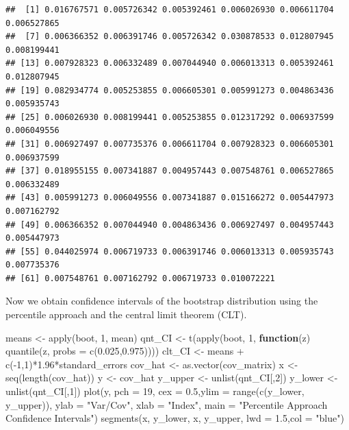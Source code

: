 \documentclass[
]{article}
\newenvironment{Shaded}{\begin{snugshade}}{\end{snugshade}}
\newcommand{\AttributeTok}[1]{\textcolor[rgb]{0.77,0.63,0.00}{#1}}
\newcommand{\ControlFlowTok}[1]{\textcolor[rgb]{0.13,0.29,0.53}{\textbf{#1}}}
\newcommand{\DecValTok}[1]{\textcolor[rgb]{0.00,0.00,0.81}{#1}}
\newcommand{\FloatTok}[1]{\textcolor[rgb]{0.00,0.00,0.81}{#1}}
\newcommand{\FunctionTok}[1]{\textcolor[rgb]{0.00,0.00,0.00}{#1}}
\newcommand{\NormalTok}[1]{#1}
\newcommand{\OtherTok}[1]{\textcolor[rgb]{0.56,0.35,0.01}{#1}}
\newcommand{\SpecialCharTok}[1]{\textcolor[rgb]{0.00,0.00,0.00}{#1}}
\newcommand{\StringTok}[1]{\textcolor[rgb]{0.31,0.60,0.02}{#1}}
\begin{document}
\begin{verbatim}
##  [1] 0.016767571 0.005726342 0.005392461 0.006026930 0.006611704 0.006527865
##  [7] 0.006366352 0.006391746 0.005726342 0.030878533 0.012807945 0.008199441
## [13] 0.007928323 0.006332489 0.007044940 0.006013313 0.005392461 0.012807945
## [19] 0.082934774 0.005253855 0.006605301 0.005991273 0.004863436 0.005935743
## [25] 0.006026930 0.008199441 0.005253855 0.012317292 0.006937599 0.006049556
## [31] 0.006927497 0.007735376 0.006611704 0.007928323 0.006605301 0.006937599
## [37] 0.018955155 0.007341887 0.004957443 0.007548761 0.006527865 0.006332489
## [43] 0.005991273 0.006049556 0.007341887 0.015166272 0.005447973 0.007162792
## [49] 0.006366352 0.007044940 0.004863436 0.006927497 0.004957443 0.005447973
## [55] 0.044025974 0.006719733 0.006391746 0.006013313 0.005935743 0.007735376
## [61] 0.007548761 0.007162792 0.006719733 0.010072221
\end{verbatim}

Now we obtain confidence intervals of the bootstrap distribution using
the percentile approach and the central limit theorem (CLT).

\begin{Shaded}
\begin{Highlighting}[]
\NormalTok{means }\OtherTok{\textless{}{-}} \FunctionTok{apply}\NormalTok{(boot, }\DecValTok{1}\NormalTok{, mean)}
\NormalTok{qnt\_CI }\OtherTok{\textless{}{-}} \FunctionTok{t}\NormalTok{(}\FunctionTok{apply}\NormalTok{(boot, }\DecValTok{1}\NormalTok{, }\ControlFlowTok{function}\NormalTok{(z) }\FunctionTok{quantile}\NormalTok{(z, }\AttributeTok{probs =} \FunctionTok{c}\NormalTok{(}\FloatTok{0.025}\NormalTok{,}\FloatTok{0.975}\NormalTok{))))}
\NormalTok{clt\_CI }\OtherTok{\textless{}{-}}\NormalTok{ means }\SpecialCharTok{+} \FunctionTok{c}\NormalTok{(}\SpecialCharTok{{-}}\DecValTok{1}\NormalTok{,}\DecValTok{1}\NormalTok{)}\SpecialCharTok{*}\FloatTok{1.96}\SpecialCharTok{*}\NormalTok{standard\_errors}
\NormalTok{cov\_hat }\OtherTok{\textless{}{-}} \FunctionTok{as.vector}\NormalTok{(cov\_matrix)}
\NormalTok{x }\OtherTok{\textless{}{-}} \FunctionTok{seq}\NormalTok{(}\FunctionTok{length}\NormalTok{(cov\_hat))}
\NormalTok{y }\OtherTok{\textless{}{-}}\NormalTok{ cov\_hat}
\NormalTok{y\_upper }\OtherTok{\textless{}{-}} \FunctionTok{unlist}\NormalTok{(qnt\_CI[,}\DecValTok{2}\NormalTok{])}
\NormalTok{y\_lower }\OtherTok{\textless{}{-}} \FunctionTok{unlist}\NormalTok{(qnt\_CI[,}\DecValTok{1}\NormalTok{])}
\FunctionTok{plot}\NormalTok{(y, }\AttributeTok{pch =} \DecValTok{19}\NormalTok{, }\AttributeTok{cex =} \FloatTok{0.5}\NormalTok{,}\AttributeTok{ylim =} \FunctionTok{range}\NormalTok{(}\FunctionTok{c}\NormalTok{(y\_lower, y\_upper)), }\AttributeTok{ylab =} \StringTok{"Var/Cov"}\NormalTok{, }\AttributeTok{xlab =} \StringTok{"Index"}\NormalTok{,}
     \AttributeTok{main =} \StringTok{"Percentile Approach Confidence Intervals"}\NormalTok{)}
\FunctionTok{segments}\NormalTok{(x, y\_lower, x, y\_upper, }\AttributeTok{lwd =} \FloatTok{1.5}\NormalTok{,}\AttributeTok{col =} \StringTok{"blue"}\NormalTok{)}
\end{Highlighting}
\end{Shaded}
\end{document}
